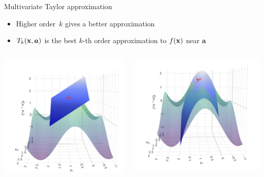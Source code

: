 \documentclass[11pt,compress,t,notes=noshow, xcolor=table]{beamer}
\begin{document}
\begin{vbframe}{Multivariate Taylor approximation}

\begin{itemize}
    \item Higher order~$k$ gives a better approximation
    \item $T_k(\mathbf{x},\bm{a})$ is the best $k$-th order approximation to $f(\mathbf{x})$ near $\bm{a}$
\end{itemize}

\begin{columns}
    \begin{column}{0.48\textwidth}
        \includegraphics[width = \textwidth]{figure_man/Taylor2D_1st100.png}
    \end{column}
    \begin{column}{0.48\textwidth}
        \includegraphics[width = \textwidth]{figure_man/Taylor2D_2nd-100.png}
    \end{column}
\end{columns}


\end{vbframe}
\end{document}
